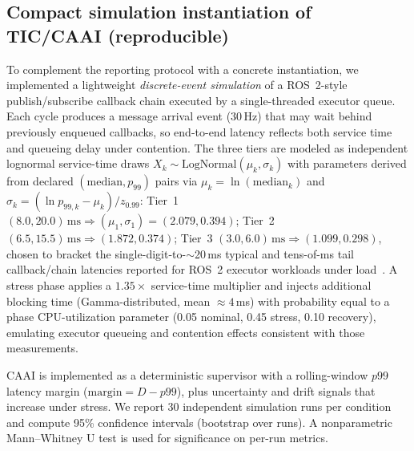\documentclass[smallextended]{svjour3}
\begin{document}
\subsection{Compact simulation instantiation of TIC/CAAI (reproducible)}
\label{subsec:sim_results}
To complement the reporting protocol with a concrete instantiation, we implemented a
lightweight \emph{discrete-event simulation} of a ROS~2-style publish/subscribe callback
chain executed by a single-threaded executor queue. Each cycle produces a message arrival
event (30\,Hz) that may wait behind previously enqueued callbacks, so end-to-end latency
reflects both service time and queueing delay under contention. The three tiers are modeled as independent lognormal service-time draws
\(X_k\sim\mathrm{LogNormal}(\mu_k,\sigma_k)\) with parameters derived from declared
\((\mathrm{median},p_{99})\) pairs via \(\mu_k=\ln(\mathrm{median}_k)\) and
\(\sigma_k=(\ln p_{99,k}-\mu_k)/z_{0.99}\): Tier~1 \((8.0,20.0)\,\mathrm{ms}\Rightarrow
(\mu_1,\sigma_1)=(2.079,0.394)\); Tier~2 \((6.5,15.5)\,\mathrm{ms}\Rightarrow(1.872,0.374)\);
Tier~3 \((3.0,6.0)\,\mathrm{ms}\Rightarrow(1.099,0.298)\), chosen to bracket the
single-digit-to-\(\sim\)20\,ms typical and tens-of-ms tail callback/chain latencies reported
for ROS~2 executor workloads under load~\cite{casini2019,kronauer2021}.
A stress phase applies a \(1.35\times\) service-time multiplier and injects additional
blocking time (Gamma-distributed, mean \(\approx 4\)\,ms) with probability equal to a
phase CPU-utilization parameter (0.05 nominal, 0.45 stress, 0.10 recovery), emulating
executor queueing and contention effects consistent with those measurements.

CAAI is implemented as a deterministic supervisor with a rolling-window \(p99\) latency
margin (\(\mathrm{margin}=D-p99\)), plus uncertainty and drift signals that increase under
stress. We report 30 independent simulation runs per condition and compute 95\% confidence
intervals (bootstrap over runs). A nonparametric Mann--Whitney U test is used for
significance on per-run metrics.
\end{document}
